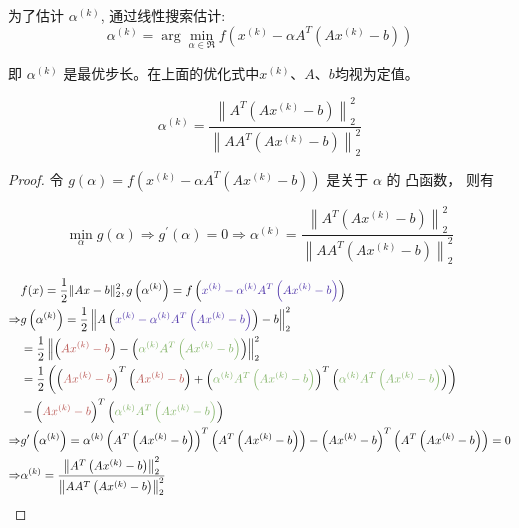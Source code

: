 为了估计 $ \alpha^{(k)} $, 通过线性搜索估计:
\begin{equation}
\alpha^{(k)}=\arg \min _{\alpha \in \Re} f\left(x^{(k)}-\alpha A^{T}\left(A x^{(k)}-b\right)\right)
\end{equation}

即 $ \alpha^{(k)} $ 是最优步长。在上面的优化式中$x^{(k)}$、$A$、$b$均视为定值。

\begin{theorem}[线性搜索估计的最优步长]
    \begin{equation}\alpha^{(k)}=\frac{\left\|A^{T}\left(A x^{(k)}-b\right)\right\|_{2}^{2}}{\left\|A A^{T}\left(A x^{(k)}-b\right)\right\|_{2}^{2}}\end{equation}
\end{theorem}

\begin{proof}
    令 $ g(\alpha)=f\left(x^{(k)}-\alpha A^{T}\left(A x^{(k)}-b\right)\right) $ 是关于 $ \alpha $ 的 凸函数， 则有

\begin{equation}
\min _{\alpha} g(\alpha) \Rightarrow g^{\prime}(\alpha)=0 \Rightarrow \alpha^{(k)}=\frac{\left\|A^{T}\left(A x^{(k)}-b\right)\right\|_{2}^{2}}{\left\|A A^{T}\left(A x^{(k)}-b\right)\right\|_{2}^{2}}
\end{equation}


\begin{equation}\begin{aligned}
    & f(x)=\frac{1}{2}\|A x-b\|_{2}^{2}, g\left(\alpha^{(k)}\right)=f\left({\color{violet} x^{(k)}-\alpha^{(k)} A^{T}\left(A x^{(k)}-b\right)} \right) \\
    \Rightarrow & g\left(\alpha^{(k)}\right)=\frac{1}{2}\left\|A\left({\color{violet} x^{(k)}-\alpha^{(k)} A^{T}\left(A x^{(k)}-b\right)} \right)-b\right\|_{2}^{2} \\
    &=\frac{1}{2}\left\|\left({\color{coral} A x^{(k)}-b} \right)-\left({\color{grass} \alpha^{(k)} A^{T}\left(A x^{(k)}-b\right)} \right)\right\|_{2}^{2} \\
    &=\frac{1}{2}\left(\left({\color{coral} A x^{(k)}-b} \right)^{T}\left({\color{coral} A x^{(k)}-b} \right)+\left({\color{grass} \alpha^{(k)} A^{T}\left(A x^{(k)}-b\right)} \right)^{T}\left({\color{grass} \alpha^{(k)} A^{T}\left(A x^{(k)}-b\right)} \right)\right) \\
    &-\left({\color{coral} A x^{(k)}-b} \right)^{T}\left({\color{grass} \alpha^{(k)} A^{T}\left(A x^{(k)}-b\right)} \right) \\
    \Rightarrow & g^{\prime}\left(\alpha^{(k)}\right)=\alpha^{(k)}\left(A^{T}\left(A x^{(k)}-b\right)\right)^{T}\left(A^{T}\left(A x^{(k)}-b\right)\right)-\left(A x^{(k)}-b\right)^{T}\left(A^{T}\left(A x^{(k)}-b\right)\right)=0 \\
    \Rightarrow &\alpha^{(k)}=\frac{\left\|A^{T}\left(A x^{(k)}-b\right)\right\|_{2}^{2}}{\left\|A A^{T}\left(A x^{(k)}-b\right)\right\|_{2}^{2}}
    \end{aligned}\end{equation}

\end{proof}


